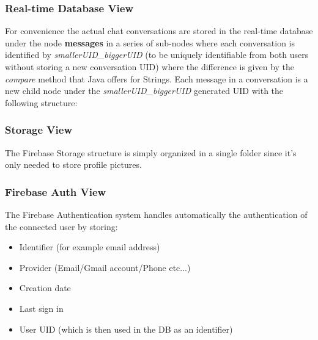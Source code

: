 \subsubsection{Real-time Database View}
\label{RealTimeDB}
For convenience the actual chat conversations are stored in the real-time database under the node \textbf{messages} in a series of sub-nodes where each conversation is identified by \textit{smallerUID\_biggerUID} (to be uniquely identifiable from both users without storing a new conversation UID) where the difference is given by the \textit{compare} method that Java offers for Strings.
Each message in a conversation is a new child node under the \textit{smallerUID\_biggerUID} generated UID with the following structure:
\subsubsection{Storage View}
The Firebase Storage structure is simply organized in a single folder since it's only needed to store profile pictures.
\subsubsection{Firebase Auth View}
The Firebase Authentication system handles automatically the authentication of the connected user by storing:
\begin{itemize}
\item Identifier (for example email address)
\item Provider (Email/Gmail account/Phone etc...)
\item Creation date
\item Last sign in
\item User UID (which is then used in the DB as an identifier)
\end{itemize} 
\clearpage
